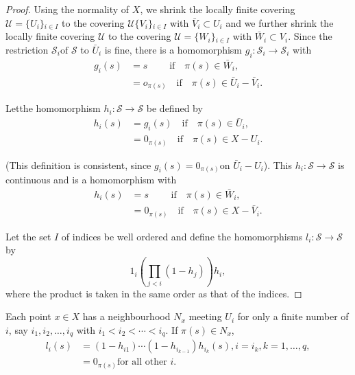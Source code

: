\begin{proof}%
Using the normality of $X$, we shrink the locally finite covering
$\mathscr{U}= \{ U_i\}{_{i \in I}}$ to the covering
$\mathscr{U} \{ V_i\}{_{i \in I}}$ with $\bar{V}_i \subset
U_i$ and we further shrink the locally finite covering $\mathscr{U}$
to the covering $\mathscr{U} = \{ W_i\}{_{i \in I}}$ with
$\bar{W}_i \subset V_i$. Since the restriction $\mathscr{S}_i \text{
  of } \mathscr{S}$ to $\bar{U}_i$ is fine, there is a homomorphism
$g_i : \mathscr{S}_i \to \mathscr{S}_i$ with  
\begin{align*}
g_i (s) & = s \qquad \; \text{if} \quad  \pi (s) \in \bar{W}_i,\\
& = o_{\pi (s)} \quad \text{if}\quad  \pi (s) \in \bar{U}_i -
\bar{V}_i.   
\end{align*}

Let\pageoriginale the homomorphism $h_i : \mathscr{S} \to \mathscr{S}$
be defined by   
\begin{align*}
h_i (s) &= g_i (s) \quad \text{if} \quad  \pi (s) \in \bar{U}_i,\\
&= 0_{\pi (s)} \quad \text{if} \quad \pi (s) \in X - U_i.
\end{align*}

(This definition is consistent, since $g_i (s) = 0_{\pi (s)} \text {
  on } \bar{U}_i - U_i$). This $h_i: \mathscr{S} \to \mathscr{S}$ is
continuous and is a homomorphism with  
\begin{align*}
h_i (s) &= s \qquad \text{ if} \quad \pi (s) \in \bar{W}_i,\\ 
&= 0_{\pi (s)} \quad \text{if} \quad  \pi (s) \in X - \bar{V}_i.
\end{align*}

Let the set $I$ of indices be well ordered and define the homomorphisms
$l_i : \mathscr{S} \to \mathscr{S} $ by  
$$
1_i \left(\prod_{j < i} (1-h_j) \right) h_i, 
$$
where the product is taken in the same order as that of the indices. 
\end{proof}

Each point $x \in X$ has a neighbourhood $N_x$ meeting $U_i$
for only  a finite number of $i$, say $i_1 , i_2 ,\ldots, i_q$ with
$i_1 < i_2 < \cdots < i_q$. If $\pi (s) \in N_x$,  
 \begin{align*}
l_i (s) & = (1-h_{i1}) \cdots (1-h_{i{_{k-1}}}) h_{i_k} (s), i = i_k,
k=1 ,\ldots, q,\\ 
&= 0_{\pi (s)} \text{for all other $i$}.
 \end{align*} 
 
